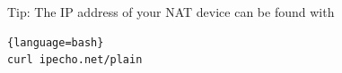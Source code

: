 Tip: The IP address of your NAT device can be found with

\begin{lstlisting}{language=bash}
curl ipecho.net/plain
\end{lstlisting}

